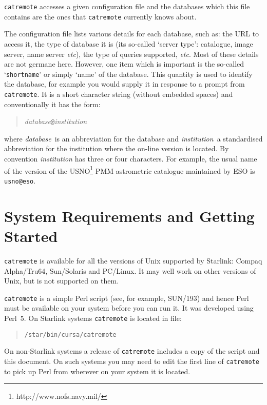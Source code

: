 \documentclass[twoside,11pt]{article}
\newcommand{\htmladdnormallinkfoot}[2]{#1\footnote{#2}}
\newcommand{\xref}[3]{#1}
\newcommand{\xlabel}[1]{}
\renewcommand{\_}{\texttt{\symbol{95}}}
\begin{document}
{\tt catremote} accesses a given configuration file and the databases
which this file contains are the ones that {\tt catremote} currently
knows about.

The configuration file lists various details for each database, such as:
the URL to access it, the type of database it is (its so-called
`server type': catalogue, image server, name server \emph{etc}\/), the
type of queries supported, \emph{etc}.  Most of these details are not
germane here.  However, one item which is important is the so-called
`{\tt short\_name}' or simply `name' of the database.  This quantity
is used to identify the database, for example you would supply it
in response to a prompt from {\tt catremote}.  It is a short character
string (without embedded spaces) and conventionally it has the form:

\begin{quote}
{\it database}{\tt @}{\it institution}
\end{quote}

where {\it database}\, is an abbreviation for the database and {\it
institution}\, a standardised abbreviation for the institution where the
on-line version is located.  By convention {\it institution}\/ has three
or four characters.  For example, the usual name of the version of the
\htmladdnormallinkfoot{USNO}{http://www.nofs.navy.mil/}
PMM astrometric catalogue maintained by ESO is {\tt usno@eso}.


\section{\xlabel{SYSREQ}\label{SYSREQ}System Requirements and Getting
Started}

{\tt catremote} is available for all the versions of Unix supported by
Starlink: Compaq Alpha/Tru64, Sun/Solaris and PC/Linux.  It may well work
on other versions of Unix, but is not supported on them.

{\tt catremote} is a simple Perl script (see, for example,
\xref{SUN/193}{sun193}{}\cite{SUN193}) and hence Perl must be
available on your system before you can run it.  It was developed using
Perl~5.  On Starlink systems {\tt catremote} is located in file:

\begin{quote}
{\tt /star/bin/cursa/catremote}
\end{quote}

On non-Starlink systems a release of {\tt catremote} includes a copy
of the script and this document.  On such systems you may need to edit
the first line of {\tt catremote} to pick up Perl from wherever on your
system it is located.
\end{document}
